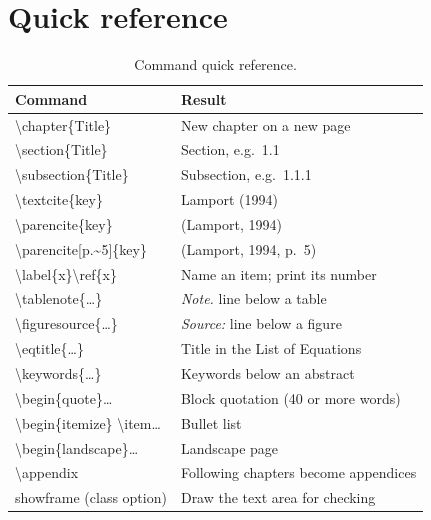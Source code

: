 \documentclass[11pt,a4paper]{article}
\newcommand\thd[1]{\bfseries #1}
\begin{document}
\clearpage
\section{Quick reference}\label{sec:quick}

\begin{table}[htbp]
\caption{Command quick reference.}
\label{tab:quick}
\small
\begin{tabularx}{\textwidth}{@{}>{\ttfamily\raggedright\arraybackslash}p{76mm}>{\raggedright\arraybackslash}X@{}}
\toprule
\normalfont\thd{Command} & \thd{Result} \\
\midrule
\textbackslash chapter\{Title\}                  & New chapter on a new page \\
\textbackslash section\{Title\}                  & Section, e.g.\ 1.1 \\
\textbackslash subsection\{Title\}               & Subsection, e.g.\ 1.1.1 \\
\textbackslash textcite\{key\}                   & Lamport (1994) \\
\textbackslash parencite\{key\}                  & (Lamport, 1994) \\
\textbackslash parencite[p.\textasciitilde 5]\{key\} & (Lamport, 1994, p.~5) \\
\textbackslash label\{x\}\quad \textbackslash ref\{x\} & Name an item; print its number \\
\textbackslash tablenote\{\ldots\}               & \emph{Note.} line below a table \\
\textbackslash figuresource\{\ldots\}            & \emph{Source:} line below a figure \\
\textbackslash eqtitle\{\ldots\}                 & Title in the List of Equations \\
\textbackslash keywords\{\ldots\}                & Keywords below an abstract \\
\textbackslash begin\{quote\}\ldots              & Block quotation (40 or more words) \\
\textbackslash begin\{itemize\} \textbackslash item\ldots & Bullet list \\
\textbackslash begin\{landscape\}\ldots          & Landscape page \\
\textbackslash appendix                          & Following chapters become appendices \\
showframe (class option)                         & Draw the text area for checking \\
\bottomrule
\end{tabularx}
\end{table}
\end{document}
